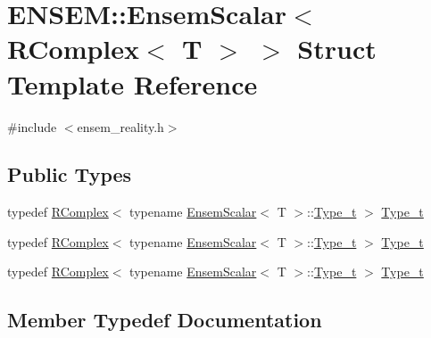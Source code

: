 \hypertarget{structENSEM_1_1EnsemScalar_3_01RComplex_3_01T_01_4_01_4}{}\section{E\+N\+S\+EM\+:\+:Ensem\+Scalar$<$ R\+Complex$<$ T $>$ $>$ Struct Template Reference}
\label{structENSEM_1_1EnsemScalar_3_01RComplex_3_01T_01_4_01_4}


{\ttfamily \#include $<$ensem\+\_\+reality.\+h$>$}

\subsection*{Public Types}
\begin{DoxyCompactItemize}
\item 
typedef \mbox{\hyperlink{classENSEM_1_1RComplex}{R\+Complex}}$<$ typename \mbox{\hyperlink{structENSEM_1_1EnsemScalar}{Ensem\+Scalar}}$<$ T $>$\+::\mbox{\hyperlink{structENSEM_1_1EnsemScalar_3_01RComplex_3_01T_01_4_01_4_abd854cbfbb45aac23836c31aa0a35076}{Type\+\_\+t}} $>$ \mbox{\hyperlink{structENSEM_1_1EnsemScalar_3_01RComplex_3_01T_01_4_01_4_abd854cbfbb45aac23836c31aa0a35076}{Type\+\_\+t}}
\item 
typedef \mbox{\hyperlink{classENSEM_1_1RComplex}{R\+Complex}}$<$ typename \mbox{\hyperlink{structENSEM_1_1EnsemScalar}{Ensem\+Scalar}}$<$ T $>$\+::\mbox{\hyperlink{structENSEM_1_1EnsemScalar_3_01RComplex_3_01T_01_4_01_4_abd854cbfbb45aac23836c31aa0a35076}{Type\+\_\+t}} $>$ \mbox{\hyperlink{structENSEM_1_1EnsemScalar_3_01RComplex_3_01T_01_4_01_4_abd854cbfbb45aac23836c31aa0a35076}{Type\+\_\+t}}
\item 
typedef \mbox{\hyperlink{classENSEM_1_1RComplex}{R\+Complex}}$<$ typename \mbox{\hyperlink{structENSEM_1_1EnsemScalar}{Ensem\+Scalar}}$<$ T $>$\+::\mbox{\hyperlink{structENSEM_1_1EnsemScalar_3_01RComplex_3_01T_01_4_01_4_abd854cbfbb45aac23836c31aa0a35076}{Type\+\_\+t}} $>$ \mbox{\hyperlink{structENSEM_1_1EnsemScalar_3_01RComplex_3_01T_01_4_01_4_abd854cbfbb45aac23836c31aa0a35076}{Type\+\_\+t}}
\end{DoxyCompactItemize}


\subsection{Member Typedef Documentation}
\mbox{\label{structENSEM_1_1EnsemScalar_3_01RComplex_3_01T_01_4_01_4_abd854cbfbb45aac23836c31aa0a35076}} 
